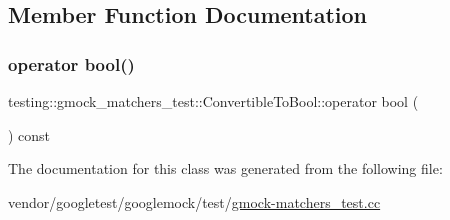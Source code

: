 \subsection{Member Function Documentation}
\mbox{\label{classtesting_1_1gmock__matchers__test_1_1_convertible_to_bool_a4ad9766b9d5179a1207af2449405f071}} 
\subsubsection{\texorpdfstring{operator bool()}{operator bool()}}
{\footnotesize\ttfamily testing\+::gmock\+\_\+matchers\+\_\+test\+::\+Convertible\+To\+Bool\+::operator bool (\begin{DoxyParamCaption}{ }\end{DoxyParamCaption}) const\hspace{0.3cm}{\ttfamily [inline]}}



The documentation for this class was generated from the following file\+:\begin{DoxyCompactItemize}
\item 
vendor/googletest/googlemock/test/\hyperlink{gmock-matchers__test_8cc}{gmock-\/matchers\+\_\+test.\+cc}\end{DoxyCompactItemize}
